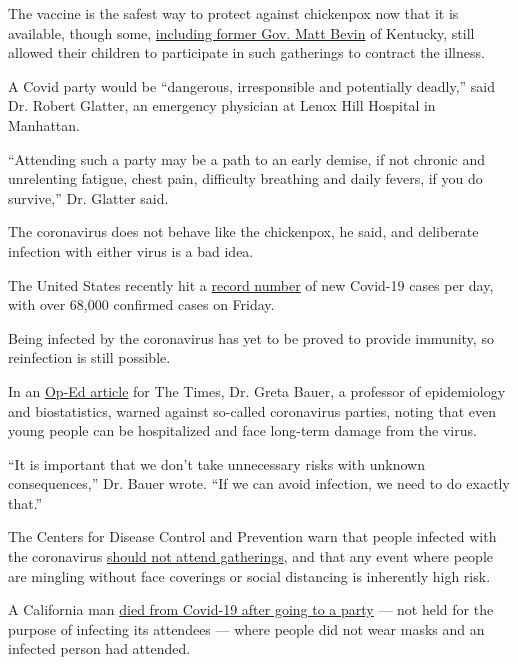 The vaccine is the safest way to protect against chickenpox now that it
is available, though some,
\href{https://www.nytimes3xbfgragh.onion/2019/03/21/us/kentucky-governor-chickenpox.html}{including
former Gov. Matt Bevin} of Kentucky, still allowed their children to
participate in such gatherings to contract the illness.

A Covid party would be ``dangerous, irresponsible and potentially
deadly,'' said Dr. Robert Glatter, an emergency physician at Lenox Hill
Hospital in Manhattan.

``Attending such a party may be a path to an early demise, if not
chronic and unrelenting fatigue, chest pain, difficulty breathing and
daily fevers, if you do survive,'' Dr. Glatter said.

The coronavirus does not behave like the chickenpox, he said, and
deliberate infection with either virus is a bad idea.

The United States recently hit a
\href{https://www.nytimes3xbfgragh.onion/interactive/2020/us/coronavirus-us-cases.html?action=click\&module=Top\%20Stories\&pgtype=Homepage\#map}{record
number} of new Covid-19 cases per day, with over 68,000 confirmed cases
on Friday.

Being infected by the coronavirus has yet to be proved to provide
immunity, so reinfection is still possible.

In an
\href{https://www.nytimes3xbfgragh.onion/2020/04/08/opinion/coronavirus-parties-herd-immunity.html}{Op-Ed
article} for The Times, Dr. Greta Bauer, a professor of epidemiology and
biostatistics, warned against so-called coronavirus parties, noting that
even young people can be hospitalized and face long-term damage from the
virus.

``It is important that we don't take unnecessary risks with unknown
consequences,'' Dr. Bauer wrote. ``If we can avoid infection, we need to
do exactly that.''

The Centers for Disease Control and Prevention warn that people infected
with the coronavirus
\href{https://www.cdc.gov/coronavirus/2019-ncov/community/large-events/considerations-for-events-gatherings.html}{should
not attend gatherings}, and that any event where people are mingling
without face coverings or social distancing is inherently high risk.

A California man
\href{https://www.washingtonpost.com/nation/2020/07/02/man-who-went-party-warned-people-not-be-an-idiot-like-me-day-before-dying-covid-19/}{died
from Covid-19 after going to a party} --- not held for the purpose of
infecting its attendees --- where people did not wear masks and an
infected person had attended.

